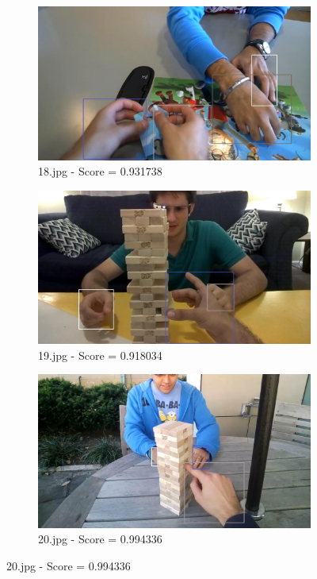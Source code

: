\begin{figure}[!h]
\begin{subfigure}[b]{0.3\textwidth}
    \end{subfigure}
    \hfill
    \begin{subfigure}[b]{0.3\textwidth}
        \centering
        \includegraphics[width=\textwidth]{images/handDetection/18.jpg}
        \caption{18.jpg - Score = 0.931738}
        
    \end{subfigure}
       
    \begin{subfigure}[b]{0.3 \textwidth}
        \centering
        \includegraphics[width=\textwidth]{images/handDetection/19.jpg}
        \caption{19.jpg - Score = 0.918034}
        
    \end{subfigure}
    \hfill
    \begin{subfigure}[b]{0.3\textwidth}
        \centering
        \includegraphics[width=\textwidth]{images/handDetection/20.jpg}
        \caption{20.jpg - Score = 0.994336}
        

\end{subfigure}
\end{figure}
